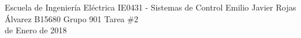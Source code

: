 \documentclass{ucrEieTarea}
\begin{document}
    {Escuela de Ingeniería Eléctrica}
    {IE0431 - Sistemas de Control}
    {Emilio Javier Rojas Álvarez}
    {B15680}
    {Grupo 901}
    {Tarea \#2\\{\footnotesize{} de Enero de 2018}}
  
  
  \newpage
  
\end{document}
